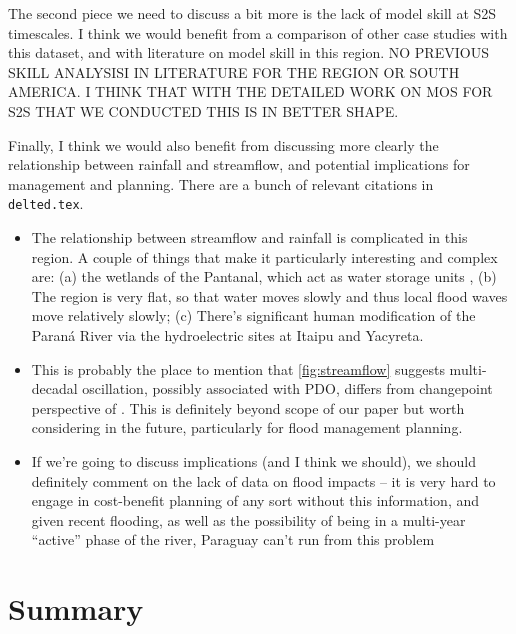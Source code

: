 \documentclass[twocol]{ametsoc}
\begin{document}
The second piece we need to discuss a bit more is the lack of model skill at S2S timescales.
I think we would benefit from a comparison of other case studies with this dataset, and with literature on model skill in this region.
NO PREVIOUS SKILL ANALYSISI IN LITERATURE FOR THE REGION OR SOUTH AMERICA. I THINK THAT WITH THE DETAILED WORK ON MOS FOR S2S THAT WE CONDUCTED THIS IS IN BETTER SHAPE.

Finally, I think we would also benefit from discussing more clearly the relationship between rainfall and streamflow, and potential implications for management and planning.
There are a bunch of relevant citations in \texttt{delted.tex}.
\begin{itemize}
	\item The relationship between streamflow and rainfall is complicated in this region. A couple of things that make it particularly interesting and complex are: (a) the wetlands of the Pantanal, which act as water storage units \citep{Bravo:2011et,Barros:2004bn}, (b) The region is very flat, so that water moves slowly and thus local flood waves move relatively slowly; (c) There's significant human modification of the Paran\'a River via the hydroelectric sites at Itaipu and Yacyreta.
  \item This is probably the place to mention that \cref{fig:streamflow} suggests multi-decadal oscillation, possibly associated with PDO, differs from changepoint perspective of \citet{Collischonn:2001bi}.
	This is definitely beyond scope of our paper but worth considering in the future, particularly for flood management planning.
	\item If we're going to discuss implications (and I think we should), we should definitely comment on the lack of data on flood impacts -- it is very hard to engage in cost-benefit planning of any sort without this information, and given recent flooding, as well as the possibility of being in a multi-year ``active'' phase of the river, Paraguay can't run from this problem
\end{itemize}



\section{Summary} \label{sec:summary}
\end{document}
